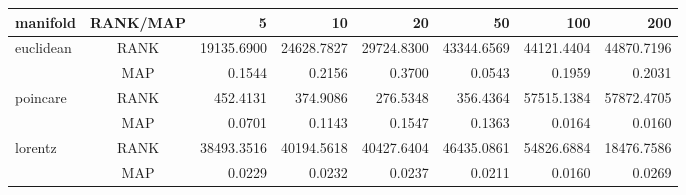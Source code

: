 
\begin{table}[htb]
  \begin{tabular}{|l|c||r|r|r|r|r|r|} \hline

  manifold & RANK/MAP & 5 & 10 & 20 & 50 & 100 & 200 \\ \hline
  euclidean & RANK & 19135.6900 & 24628.7827 & 29724.8300 & 43344.6569 & 44121.4404 & 44870.7196 \\ \cline{3-8}
 & MAP & 0.1544 & 0.2156 & 0.3700 & 0.0543 & 0.1959 & 0.2031 \\ \hline
  poincare & RANK & 452.4131 & 374.9086 & 276.5348 & 356.4364 & 57515.1384 & 57872.4705 \\ \cline{3-8}
 & MAP & 0.0701 & 0.1143 & 0.1547 & 0.1363 & 0.0164 & 0.0160 \\ \hline
  lorentz & RANK & 38493.3516 & 40194.5618 & 40427.6404 & 46435.0861 & 54826.6884 & 18476.7586 \\ \cline{3-8}
 & MAP & 0.0229 & 0.0232 & 0.0237 & 0.0211 & 0.0160 & 0.0269 \\ \hline

  \end{tabular}
\end{table}

